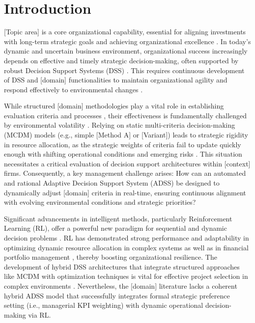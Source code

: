 \documentclass[10pt,twocolumn]{article}
\begin{document}
\thispagestyle{firstpage}

\section{Introduction}

[Topic area] is a core organizational capability, essential for
aligning investments with long-term strategic goals and achieving
organizational excellence \citep{Author2021, Author2016}. In
today's dynamic and uncertain business environment, organizational
success increasingly depends on effective and timely strategic
decision-making, often supported by robust Decision Support Systems
(DSS) \citep{Author2024, Author2021b}. This requires continuous
development of DSS and [domain] functionalities to maintain
organizational agility and respond effectively to environmental
changes \citep{Author2023, Author2023b, Author2020}.

While structured [domain] methodologies play a vital role in
establishing evaluation criteria and processes \citep{Author2020b,
Author2017}, their effectiveness is fundamentally challenged by
environmental volatility \citep{Author2016b, Author2012}. Relying
on static multi-criteria decision-making (MCDM) models (e.g.,
simple [Method A] or [Variant]) leads to strategic rigidity in
resource allocation, as the strategic weights of criteria fail to
update quickly enough with shifting operational conditions and
emerging risks \citep{Author2017b}. This situation necessitates a
critical evaluation of decision support architectures within
[context] firms. Consequently, a key management challenge arises:
How can an automated and rational Adaptive Decision Support System
(ADSS) be designed to dynamically adjust [domain] criteria in
real-time, ensuring continuous alignment with evolving
environmental conditions and strategic priorities?

Significant advancements in intelligent methods, particularly
Reinforcement Learning (RL), offer a powerful new paradigm for
sequential and dynamic decision problems \citep{Author2021c}. RL
has demonstrated strong performance and adaptability in optimizing
dynamic resource allocation in complex systems as well as in
financial portfolio management \citep{Author2025}, thereby boosting
organizational resilience. The development of hybrid DSS
architectures that integrate structured approaches like MCDM with
optimization techniques is vital for effective project selection in
complex environments \citep{Author2025b}. Nevertheless, the [domain]
literature lacks a coherent hybrid ADSS model that successfully
integrates formal strategic preference setting (i.e., managerial
KPI weighting) with dynamic operational decision-making via RL.
\end{document}
